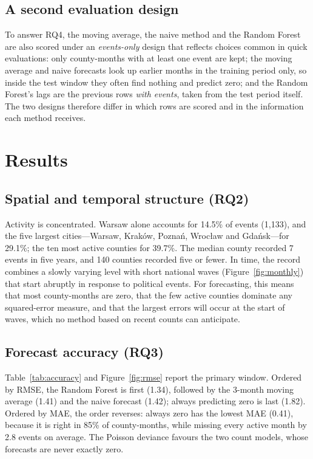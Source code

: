 \documentclass[11pt,a4paper]{article}
\begin{document}
\subsection{A second evaluation design}

To answer RQ4, the moving average, the naive method and the Random Forest are also scored under an \emph{events-only} design that reflects choices common in quick evaluations: only county-months with at least one event are kept; the moving average and naive forecasts look up earlier months in the training period only, so inside the test window they often find nothing and predict zero; and the Random Forest's lags are the previous rows \emph{with events}, taken from the test period itself. The two designs therefore differ in which rows are scored and in the information each method receives.

\section{Results}
\label{sec:results}

\subsection{Spatial and temporal structure (RQ2)}
\label{sec:res-patterns}

Activity is concentrated. Warsaw alone accounts for 14.5\% of events (1{,}133), and the five largest cities---Warsaw, Kraków, Poznań, Wrocław and Gdańsk---for 29.1\%; the ten most active counties for 39.7\%. The median county recorded 7 events in five years, and 140 counties recorded five or fewer. In time, the record combines a slowly varying level with short national waves (Figure~\ref{fig:monthly}) that start abruptly in response to political events. For forecasting, this means that most county-months are zero, that the few active counties dominate any squared-error measure, and that the largest errors will occur at the start of waves, which no method based on recent counts can anticipate.

\subsection{Forecast accuracy (RQ3)}
\label{sec:res-accuracy}

Table~\ref{tab:accuracy} and Figure~\ref{fig:rmse} report the primary window. Ordered by RMSE, the Random Forest is first (1.34), followed by the 3-month moving average (1.41) and the naive forecast (1.42); always predicting zero is last (1.82). Ordered by MAE, the order reverses: always zero has the lowest MAE (0.41), because it is right in 85\% of county-months, while missing every active month by 2.8 events on average. The Poisson deviance favours the two count models, whose forecasts are never exactly zero.
\end{document}
